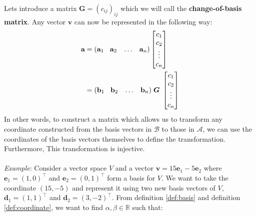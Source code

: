 \documentclass[a4paper,12pt]{book}
\newcommand{\set}[1]{\mathcal{#1}}
\newcommand{\matrx}[1]{\bm{#1}}
\newcommand{\vectr}[1]{\textbf{#1}}
\newcommand{\real}{\mathbb{R}}
\newcommand{\italic}[1]{\textit{#1}}
\begin{document}
	Lets introduce a matrix $ \matrx{G} = (c_{ij})_{ij}$ which we will call the \textbf{change-of-basis matrix}. Any vector $ \vectr{v} $ can now be represented in the following way:
	\begin{align}
		\vectr{a} &= (\vectr{a}_1 \hspace{3mm} \vectr{a}_2 \hspace{3mm} \ldots \hspace{3mm} \vectr{a}_n) \begin{bmatrix}
			c_1 \\ c_2 \\ \vdots \\ c_n
		\end{bmatrix} \\
		&= (\vectr{b}_1 \hspace{3mm} \vectr{b}_2 \hspace{3mm} \ldots \hspace{3mm} \vectr{b}_n) \hspace{1mm} \matrx{G} \hspace{1mm} \begin{bmatrix}
			c_1 \\ c_2 \\ \vdots \\ c_n
		\end{bmatrix}
	\end{align} 
	In other words, to construct a matrix which allows us to transform any coordinate constructed from the basis vectors in $ \set{B} $ to those in $ \set{A} $, we can use the coordinates of the basis vectors themselves to define the transformation. Furthermore, This transformation is injective.
	\\\\
	\italic{Example}: Consider a vector space $ V $ and a vector $ \vectr{v} = 15\vectr{e}_1 - 5\vectr{e}_2 $ where $ \vectr{e}_1 = (1, 0)^{\top} $ and $ \vectr{e}_2 = (0, 1)^{\top} $ form a basis for $ V $. We want to take the coordinate $(15, -5)$ and represent it using two new basis vectors of $ V $, $ \vectr{d}_1 = (1, 1)^{\top} $ and $ \vectr{d}_2 = (3, -2)^{\top} $. From definition \ref{def:basis} and definition \ref{def:coordinate}, we want to find $ \alpha, \beta \in \real $ such that: 
\end{document}

